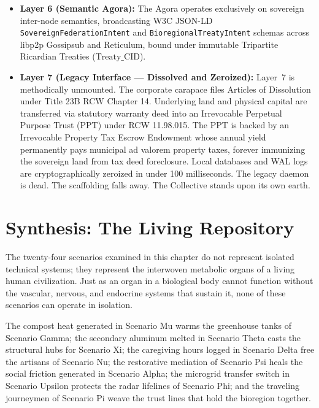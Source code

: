 \begin{itemize}
    \item \textbf{Layer 6 (Semantic Agora):} The Agora operates exclusively on sovereign inter-node semantics, broadcasting W3C JSON-LD \texttt{SovereignFederationIntent} and \texttt{BioregionalTreatyIntent} schemas across libp2p Gossipsub and Reticulum, bound under immutable Tripartite Ricardian Treaties ($\mathrm{Treaty\_CID}$).
    \item \textbf{Layer 7 (Legacy Interface --- Dissolved and Zeroized):} Layer~7 is methodically unmounted. The corporate carapace files Articles of Dissolution under Title 23B RCW Chapter 14. Underlying land and physical capital are transferred via statutory warranty deed into an Irrevocable Perpetual Purpose Trust (PPT) under RCW 11.98.015. The PPT is backed by an Irrevocable Property Tax Escrow Endowment whose annual yield permanently pays municipal ad valorem property taxes, forever immunizing the sovereign land from tax deed foreclosure. Local databases and WAL logs are cryptographically zeroized in under 100 milliseconds. The legacy daemon is dead. The scaffolding falls away. The Collective stands upon its own earth.
\end{itemize}

\section{Synthesis: The Living Repository}
\label{sec:synthesis_living_repo}

The twenty-four scenarios examined in this chapter do not represent isolated technical systems; they represent the interwoven metabolic organs of a living human civilization. Just as an organ in a biological body cannot function without the vascular, nervous, and endocrine systems that sustain it, none of these scenarios can operate in isolation. 

The compost heat generated in Scenario Mu warms the greenhouse tanks of Scenario Gamma; the secondary aluminum melted in Scenario Theta casts the structural hubs for Scenario Xi; the caregiving hours logged in Scenario Delta free the artisans of Scenario Nu; the restorative mediation of Scenario Psi heals the social friction generated in Scenario Alpha; the microgrid transfer switch in Scenario Upsilon protects the radar lifelines of Scenario Phi; and the traveling journeymen of Scenario Pi weave the trust lines that hold the bioregion together.

